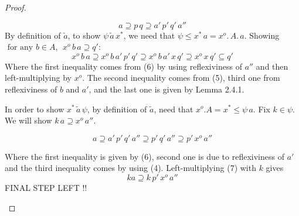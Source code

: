 \documentclass[18pt,a4paper]{article}
\theoremstyle{definition}
\begin{document}
\begin{proof}
\begin{enumerate}[label=(\roman*)]
				\begin{equation}
					a \supseteq p\,q \supseteq a'\,p'\,q'\,a''
				\end{equation}
				By definition of $\tilde{a}$, to show $\psi \, \tilde{a} \, x^*$,
				we need that $\psi \leq x^*\,a=x^o.\,A.\,a$. Showing
				$\text{ for any } b\in A$, $\;  x^o\,b\,a \supseteq q'$:
				\[ x^o\,b\,a \supseteq x^o\,b\,a'\,p'\,q' \supseteq x^o\,b\,a'\,x\,q'
				\supseteq x^o\,x\,q' \subseteq q'\]
				Where the first inequality comes from (6) by using reflexiviness of $a''$ and then
				left-multiplying by $x^o$. The second inequality comes from (5),
				third one from reflexiviness of $b$ and $a'$,
				and the last one is given by Lemma 2.4.1.

				In order to show $x^* \, \tilde{a} \, \psi$, by definition of $\tilde{a}$,
				need that $x^o.A=x^* \leq \psi\,a$. Fix $k\in \psi$. We will show
				$k\,a \supseteq x^o \, a''$.

				\begin{equation}
					a\supseteq a'\,p'\,q'\,a'' \supseteq p'\,q'\,a''
					\supseteq p' \,x^o \,a''
				\end{equation}

				Where the first inequality is given by (6), second one
				is due to reflexiviness	of $a'$ and the third inequality comes by using (4).
				Left-multiplying (7) with $k$ gives
				\begin{equation}
					ka \supseteq k\,p'\,x^o\,a''
				\end{equation}
				FINAL STEP LEFT !!
\end{enumerate}
	\end{proof}
	
\end{document}
